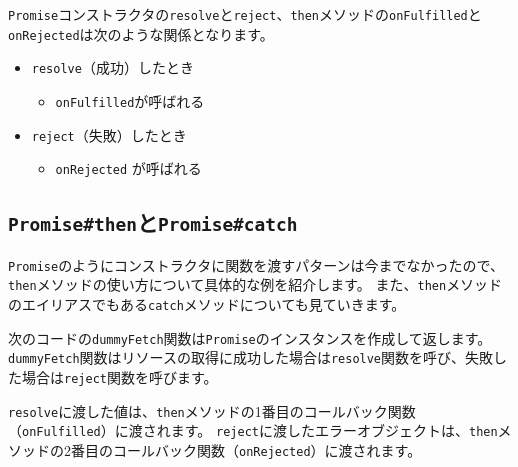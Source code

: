 \texttt{Promise}コンストラクタの\texttt{resolve}と\texttt{reject}、\texttt{then}メソッドの\texttt{onFulfilled}と\texttt{onRejected}は次のような関係となります。

\begin{itemize}
\item
  \texttt{resolve}（成功）したとき

  \begin{itemize}
  \item
    \texttt{onFulfilled}が呼ばれる
  \end{itemize}
\item
  \texttt{reject}（失敗）したとき

  \begin{itemize}
  \item
    \texttt{onRejected} が呼ばれる
  \end{itemize}
\end{itemize}

\hypertarget{promise-then-and-catch}{%
\subsection{\texorpdfstring{\texttt{Promise\#then}と\texttt{Promise\#catch}}{Promise\#thenとPromise\#catch}}\label{promise-then-and-catch}}

\texttt{Promise}のようにコンストラクタに関数を渡すパターンは今までなかったので、\texttt{then}メソッドの使い方について具体的な例を紹介します。
また、\texttt{then}メソッドのエイリアスでもある\texttt{catch}メソッドについても見ていきます。

次のコードの\texttt{dummyFetch}関数は\texttt{Promise}のインスタンスを作成して返します。
\texttt{dummyFetch}関数はリソースの取得に成功した場合は\texttt{resolve}関数を呼び、失敗した場合は\texttt{reject}関数を呼びます。

\texttt{resolve}に渡した値は、\texttt{then}メソッドの1番目のコールバック関数（\texttt{onFulfilled}）に渡されます。
\texttt{reject}に渡したエラーオブジェクトは、\texttt{then}メソッドの2番目のコールバック関数（\texttt{onRejected}）に渡されます。

